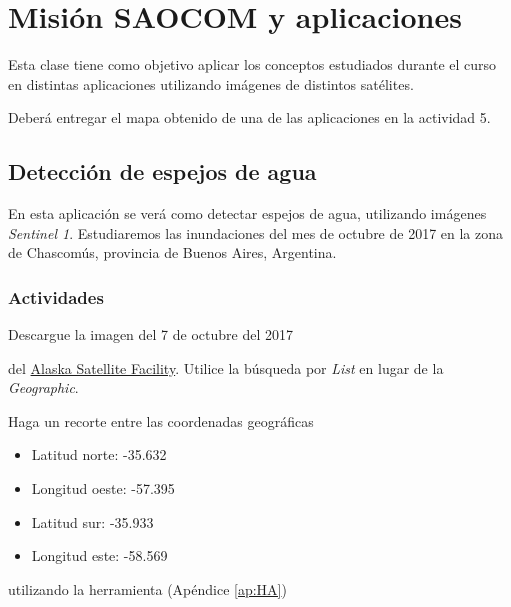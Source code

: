 \chapter{Misión SAOCOM y aplicaciones}
Esta clase tiene como objetivo aplicar los conceptos estudiados durante el curso en distintas aplicaciones utilizando imágenes de distintos satélites.

Deberá entregar el mapa obtenido de una de las aplicaciones en la actividad 5.

\section{Detección de espejos de agua}

En esta aplicación se verá como detectar espejos de agua, utilizando imágenes \emph{Sentinel 1}. Estudiaremos las inundaciones del mes de octubre de 2017 en la zona de Chascomús, provincia de Buenos Aires, Argentina.



\subsection{Actividades}

\begin{que}
    Descargue la imagen del 7 de octubre del 2017
    \begin{center}\end{center} del \href{https://vertex.daac.asf.alaska.edu/}{Alaska Satellite Facility}. Utilice la búsqueda por \emph{List} en lugar de la \emph{Geographic}.
\end{que}

\begin{que}
    Haga un recorte entre las coordenadas geográficas
    \begin{itemize}
        \item Latitud norte: -35.632
        \item Longitud oeste: -57.395
        \item Latitud sur: -35.933
        \item Longitud este: -58.569
    \end{itemize}
    utilizando la herramienta  (Apéndice \ref{ap:HA})
\end{que}

